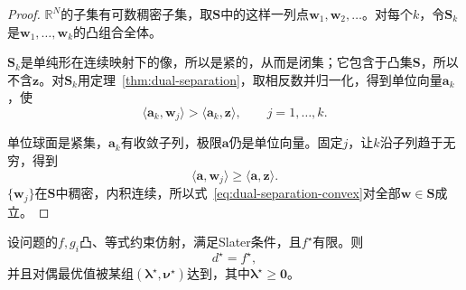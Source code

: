 \begin{proof}
 $\mathbb{R}^N$的子集有可数稠密子集，取$\bm{S}$中的这样一列点$\bm{w}_1,\bm{w}_2,\ldots$。对每个$k$，令$\bm{S}_k$是$\bm{w}_1,\ldots,\bm{w}_k$的凸组合全体。

 $\bm{S}_k$是单纯形在连续映射下的像，所以是紧的，从而是闭集；它包含于凸集$\bm{S}$，所以不含$\bm{z}$。对$\bm{S}_k$用定理~\ref{thm:dual-separation}，取相反数并归一化，得到单位向量$\bm{a}_k$，使
 \[
  \langle\bm{a}_k,\bm{w}_j\rangle>\langle\bm{a}_k,\bm{z}\rangle,\qquad j=1,\ldots,k.
 \]

 单位球面是紧集，$\bm{a}_k$有收敛子列，极限$\bm{a}$仍是单位向量。固定$j$，让$k$沿子列趋于无穷，得到
 \[
  \langle\bm{a},\bm{w}_j\rangle\geq\langle\bm{a},\bm{z}\rangle.
 \]
 $\{\bm{w}_j\}$在$\bm{S}$中稠密，内积连续，所以式~\eqref{eq:dual-separation-convex}对全部$\bm{w}\in\bm{S}$成立。
\end{proof}

\begin{theorem}[Slater条件下的强对偶]
 \label{thm:dual-slater}
 设问题的$f,g_i$凸、等式约束仿射，满足Slater条件，且$f^\star$有限。则
 \begin{equation}
  d^\star=f^\star,
  \label{eq:dual-strong}
 \end{equation}
 并且对偶最优值被某组$(\bm{\lambda}^\star,\bm{\nu}^\star)$达到，其中$\bm{\lambda}^\star\geq\bm{0}$。
\end{theorem}

